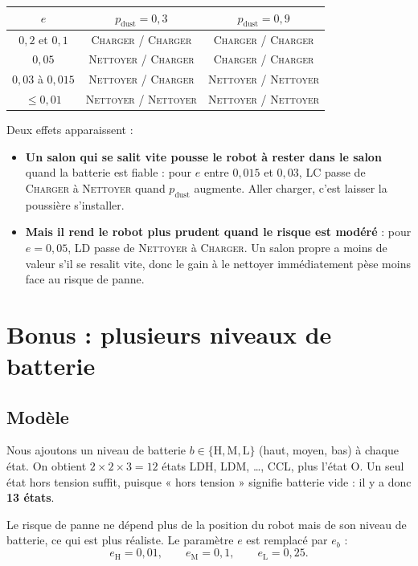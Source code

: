\documentclass[11pt,a4paper]{article}
\newcommand{\N}{\textsc{Nettoyer}}
\newcommand{\C}{\textsc{Charger}}
\newcommand{\pd}{p_{\text{dust}}}
\begin{document}
\begin{center}
\begin{tabular}{c c c}
\toprule
$e$ & $\pd = 0{,}3$ & $\pd = 0{,}9$ \\
\midrule
$0{,}2$ et $0{,}1$ & \C{} / \C & \C{} / \C \\
$0{,}05$ & \N{} / \C & \C{} / \C \\
$0{,}03$ à $0{,}015$ & \N{} / \C & \N{} / \N \\
$\le 0{,}01$ & \N{} / \N & \N{} / \N \\
\bottomrule
\end{tabular}
\end{center}

Deux effets apparaissent :
\begin{itemize}
  \item \textbf{Un salon qui se salit vite pousse le robot à rester dans le salon} quand la batterie est
        fiable : pour $e$ entre $0{,}015$ et $0{,}03$, LC passe de \C{} à \N{} quand $\pd$ augmente.
        Aller charger, c'est laisser la poussière s'installer.
  \item \textbf{Mais il rend le robot plus prudent quand le risque est modéré} : pour $e = 0{,}05$, LD passe de
        \N{} à \C. Un salon propre a moins de valeur s'il se resalit vite, donc le gain à le nettoyer
        immédiatement pèse moins face au risque de panne.
\end{itemize}

\section{Bonus : plusieurs niveaux de batterie}

\subsection{Modèle}

Nous ajoutons un niveau de batterie $b \in \{\text{H}, \text{M}, \text{L}\}$ (haut, moyen, bas) à chaque état.
On obtient $2 \times 2 \times 3 = 12$ états LDH, LDM, \dots, CCL, plus l'état O. Un seul état hors tension suffit,
puisque « hors tension » signifie batterie vide : il y a donc \textbf{13 états}.

Le risque de panne ne dépend plus de la position du robot mais de son niveau de batterie, ce qui est plus réaliste.
Le paramètre $e$ est remplacé par $e_b$ :
\[
e_{\text{H}} = 0{,}01, \qquad e_{\text{M}} = 0{,}1, \qquad e_{\text{L}} = 0{,}25.
\]
\end{document}
